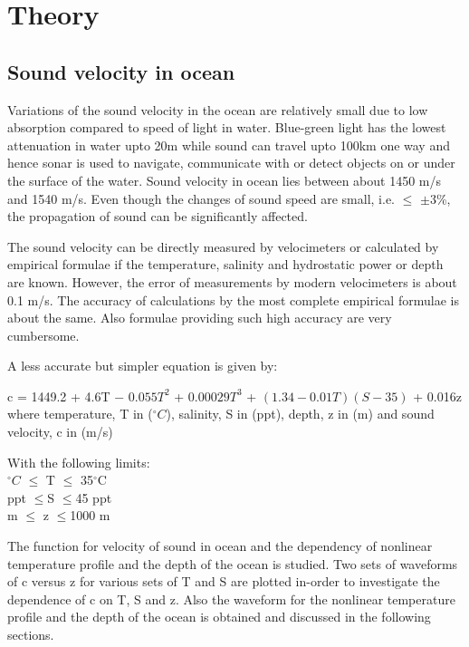 \chapter{Theory} \label{Theory}
\section{Sound velocity in ocean} \label{Sound velocity in ocean}
\noindent Variations of the sound velocity in the ocean are relatively small due to low absorption compared to speed of light in water. Blue-green light has the lowest attenuation in water upto 20m while sound can travel upto 100km one way and hence sonar is used to navigate, communicate with or detect objects on or under the surface of the water. Sound velocity in ocean lies between about 1450 m/s and 1540 m/s. Even though the changes of sound speed are small, i.e.  $\leq$ $\pm 3$\%, the propagation of sound can be significantly affected.

\noindent The sound velocity can be directly measured by velocimeters or calculated by empirical formulae if the temperature, salinity and hydrostatic power or depth are known. However, the error of measurements by modern velocimeters is about 0.1 m/s. The accuracy of calculations by the most complete empirical formulae is about the same. Also formulae providing such high accuracy are very cumbersome. 

\noindent A less accurate but simpler equation is given by:

c = 1449.2 + 4.6T $-$ $0.055T^2$ + $0.00029T^3$ + $(1.34 -0.01T) (S-35)$ + 0.016z \\
\noindent where temperature, T in ($^{\circ}C$), salinity, S in (ppt), depth, z in (m) and sound velocity, c in (m/s) 

\noindent With the following limits: \\
$^{\circ}C$   $\leq$ T   $\leq$ 35$^{\circ}$C  \\
 ppt   $\leq$S   $\leq$45 ppt \\
 m   $\leq$ z   $\leq$1000 m

\noindent The function for velocity of sound in ocean and the dependency of nonlinear temperature profile and the depth of the ocean is studied. Two sets of waveforms of c versus z for various sets of T and S are plotted in-order to investigate the dependence of c on T, S and z. Also the waveform for the nonlinear temperature profile and the depth of the ocean is obtained and discussed in the following sections.